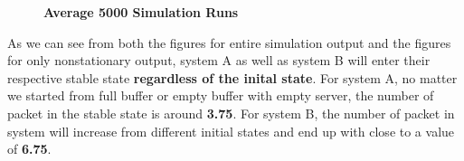 \documentclass[12pt]{article}  %
\theoremstyle{definition}
\theoremstyle{remark}
\begin{document}
\begin{figure}
{        \label{fig:systemBinit0all}
}
\hfill
{}
\caption{\textbf{Average 5000 Simulation Runs}}
\end{figure}

As we can see from both the figures for entire simulation output and the figures for only nonstationary output, system A as well as system B will enter their respective stable state \textbf{regardless of the inital state}.
For system A, no matter we started from full buffer or empty buffer with empty server, the number of packet in the stable state is around \textbf{3.75}.
For system B, the number of packet in system will increase from different initial states and end up with close to a value of \textbf{6.75}.
\end{document}
